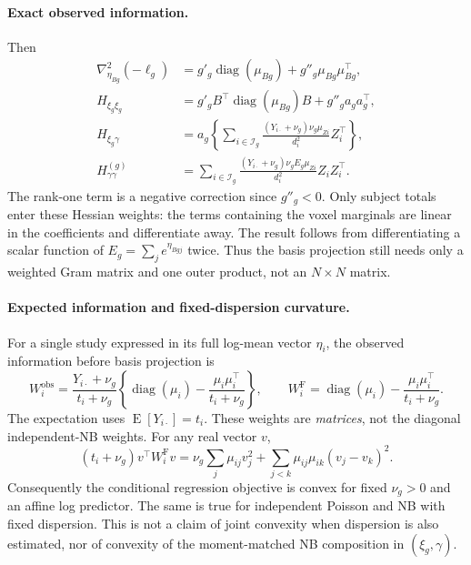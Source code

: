 \documentclass[11pt,a4paper]{article}
\newcommand{\diag}{\operatorname{diag}}
\newcommand{\E}{\operatorname{E}}
\numberwithin{equation}{section}
\begin{document}
\paragraph{Exact observed information.}
Then
\begin{align}
 \nabla_{\eta_{Bg}}^2(-\ell_g)
 &=g'_g\diag(\mu_{Bg})+g''_g\mu_{Bg}\mu_{Bg}^\top,\\
 H_{\xi_g\xi_g}
 &=g'_g B^\top\diag(\mu_{Bg})B+g''_g a_ga_g^\top,\\
 H_{\xi_g\gamma}
 &=a_g\left\{\sum_{i\in\mathcal I_g}
       \frac{(Y_{i\cdot}+\nu_g)\nu_g\mu_{Zi}}{d_i^2}Z_i^\top\right\},\\
 H_{\gamma\gamma}^{(g)}
 &=\sum_{i\in\mathcal I_g}
       \frac{(Y_{i\cdot}+\nu_g)\nu_g E_g\mu_{Zi}}{d_i^2}Z_iZ_i^\top.
 \label{eq:clustered}
\end{align}
The rank-one term is a negative correction since $g''_g<0$.
Only subject totals enter these Hessian weights: the terms containing the
voxel marginals are linear in the coefficients and differentiate away.
The result follows from differentiating a scalar function of
$E_g=\sum_j e^{\eta_{Bgj}}$ twice. Thus the basis projection still needs only
a weighted Gram matrix and one outer product, not an $N\times N$ matrix.

\paragraph{Expected information and fixed-dispersion curvature.}
For a single study expressed in its full log-mean vector $\eta_i$,
the observed information before basis projection is
\begin{equation}\label{eq:cluster-local-information}
 W_i^{\mathrm{obs}}
 =\frac{Y_{i\cdot}+\nu_g}{t_i+\nu_g}
       \left\{\diag(\mu_i)-\frac{\mu_i\mu_i^\top}{t_i+\nu_g}\right\},
 \qquad
 W_i^{\mathrm F}=\diag(\mu_i)-\frac{\mu_i\mu_i^\top}{t_i+\nu_g}.
\end{equation}
The expectation uses $\E[Y_{i\cdot}]=t_i$. These weights are \emph{matrices},
not the diagonal independent-NB weights. For any real vector $v$,
\begin{equation}\label{eq:cluster-positive}
 (t_i+\nu_g)v^\top W_i^{\mathrm F}v
 =\nu_g\sum_j\mu_{ij}v_j^2
   +\sum_{j<k}\mu_{ij}\mu_{ik}(v_j-v_k)^2.
\end{equation}
Consequently the conditional regression objective is convex for fixed
$\nu_g>0$ and an affine log predictor. The same is true for independent
Poisson and NB with fixed dispersion. This is not a claim of joint convexity
when dispersion is also estimated, nor of convexity of the
moment-matched NB composition in $(\xi_g,\gamma)$.
\end{document}
